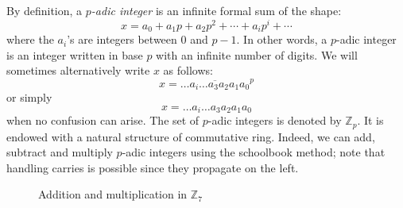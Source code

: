 \documentclass[11pt]{article}
\numberwithin{equation}{section}
\numberwithin{figure}{section}
\theoremstyle{definition}
\newcommand{\Z}{\mathbb Z}
\begin{document}
By definition, a \emph{$p$-adic integer} is an infinite formal sum of 
the shape:
$$x = a_0 + a_1 p + a_2 p^2 + \cdots + a_i p^i + \cdots$$
where the $a_i$'s are integers between $0$ and $p{-}1$. In other words,
a $p$-adic integer 
is an integer written in base $p$ with an infinite number of 
digits. We will sometimes alternatively write $x$ as follows:
$$x = \overline{\ldots a_i \ldots a_3 a_2 a_1 a_0}^p$$
or simply
$$x = \ldots a_i \ldots a_3 a_2 a_1 a_0$$
when no confusion can arise.
The set of $p$-adic integers is denoted by $\Z_p$. It is endowed with a 
natural structure of commutative ring. Indeed, we can add, subtract and 
multiply $p$-adic integers using the schoolbook method; note that 
handling carries is possible since they propagate on the left.
%
\begin{figure}
\hfill
{}
\hspace{2cm}
\hfill\null

\caption{Addition and multiplication in $\Z_7$}
\end{figure}
\end{document}
